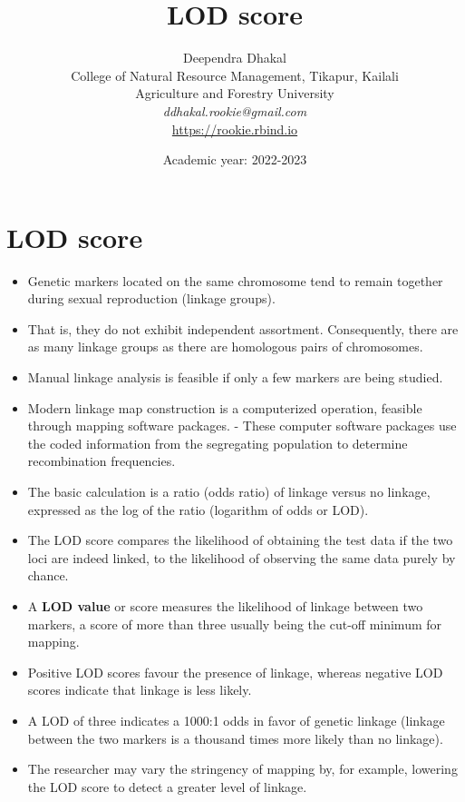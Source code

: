 \documentclass[11pt,dvipsnames,ignorenonframetext,aspectratio=169]{beamer}
\title[]{LOD score}
\author[
        Deependra Dhakal\\
College of Natural Resource Management, Tikapur, Kailali\\
Agriculture and Forestry University\\
\textit{ddhakal.rookie@gmail.com}\\
\url{https://rookie.rbind.io}
    ]{Deependra Dhakal\\
College of Natural Resource Management, Tikapur, Kailali\\
Agriculture and Forestry University\\
\textit{ddhakal.rookie@gmail.com}\\
\url{https://rookie.rbind.io}}
\date[
      Academic year: 2022-2023
  ]{
      Academic year: 2022-2023
        }
\providecommand{\tightlist}{%
  \setlength{\itemsep}{0pt}\setlength{\parskip}{0pt}}
\begin{document}
  \begin{frame}[plain]
  \titlepage
  \end{frame}



\hypertarget{lod-score}{%
\section{LOD score}\label{lod-score}}

\begin{frame}{}
\protect\hypertarget{section}{}
\begin{itemize}
\tightlist
\item
  Genetic markers located on the same chromosome tend to remain together
  during sexual reproduction (linkage groups).
\item
  That is, they do not exhibit independent assortment. Consequently,
  there are as many linkage groups as there are homologous pairs of
  chromosomes.
\item
  Manual linkage analysis is feasible if only a few markers are being
  studied.
\item
  Modern linkage map construction is a computerized operation, feasible
  through mapping software packages. - These computer software packages
  use the coded information from the segregating population to determine
  recombination frequencies.
\item
  The basic calculation is a ratio (odds ratio) of linkage versus no
  linkage, expressed as the log of the ratio (logarithm of odds or LOD).
\end{itemize}
\end{frame}

\begin{frame}{}
\protect\hypertarget{section-1}{}
\begin{itemize}
\tightlist
\item
  The LOD score compares the likelihood of obtaining the test data if
  the two loci are indeed linked, to the likelihood of observing the
  same data purely by chance.
\item
  A \textbf{LOD value} or score measures the likelihood of linkage
  between two markers, a score of more than three usually being the
  cut-off minimum for mapping.
\item
  Positive LOD scores favour the presence of linkage, whereas negative
  LOD scores indicate that linkage is less likely.
\item
  A LOD of three indicates a 1000:1 odds in favor of genetic linkage
  (linkage between the two markers is a thousand times more likely than
  no linkage).
\item
  The researcher may vary the stringency of mapping by, for example,
  lowering the LOD score to detect a greater level of linkage.
\end{itemize}
\end{frame}
\end{document}

